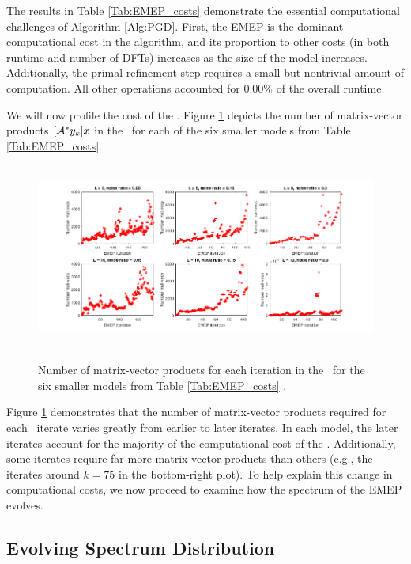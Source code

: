 The results in Table \ref{Tab:EMEP_costs} demonstrate the essential computational challenges of Algorithm \ref{Alg:PGD}.  First, the EMEP is the dominant computational cost in the algorithm, and its proportion to other costs (in both runtime and number of DFTs) increases as the size of the model increases.  Additionally, the primal refinement step requires a small but nontrivial amount of computation.  All other operations accounted for $0.00\%$ of the overall runtime. 



We will now profile the cost of the \emep.
Figure \ref{Fig:EMEP_costs_num_mat_vecs} depicts the number of matrix-vector products $[{\mathcal A}^*y_k]x$ in the \emep \ for each of the six smaller models from Table \ref{Tab:EMEP_costs}. 

\begin{figure}[H]
\centering
\hbox{\hspace{-1.2cm} \includegraphics[scale=0.6]{EMEP_costs_num_mat_vecs} }\vspace{-0.4cm}
	\caption{Number of matrix-vector products for each iteration in the \emep \ for the six smaller models from Table \ref{Tab:EMEP_costs}	.}
\label{Fig:EMEP_costs_num_mat_vecs}
\end{figure}

Figure \ref{Fig:EMEP_costs_num_mat_vecs} demonstrates that the number of matrix-vector products required for each \emep \ iterate varies greatly from earlier to later iterates.  
In each model, the later iterates account for the majority of the computational cost of the \emep.  
Additionally, some iterates require far more matrix-vector products than others (e.g., the iterates around $k=75$ in the bottom-right plot).
To help explain this change in computational costs, we now proceed to examine how the spectrum of the EMEP evolves.



\subsection{Evolving Spectrum Distribution} 	\label{Subsubsec:evol_mats-EMEP_spectrum_and_clustering}


